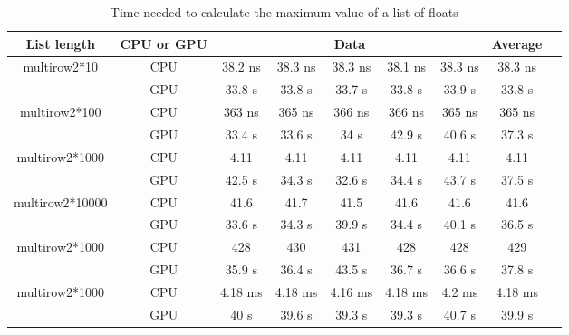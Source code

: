 \begin{table}[H]
  \caption{Time needed to calculate the maximum value of a list of floats}
  \label{table:time}
  \begin{center}
	  \begin{tabular}{| c | c | c | c | c | c | c | c | c |}
	    \hline
	    List length & CPU or GPU & \multicolumn{5}{|c|}{Data} & Average\\
		  \hline
		  multirow{2}{*}{10} & CPU & 38.2 ns & 38.3 ns & 38.3 ns & 38.1 ns & 38.3 ns & 38.3 ns\\ 
		  \hline
		  & GPU & 33.8 \mu s & 33.8 \mu s & 33.7 \mu s & 33.8 \mu s & 33.9 \mu s & 33.8 \mu s\\ 
		  \hline
		  multirow{2}{*}{100} & CPU & 363 ns & 365 ns & 366 ns & 366 ns & 365 ns & 365 ns\\ 
		  \hline
		  & GPU & 33.4 \mu s & 33.6 \mu s & 34 \mu s & 42.9 \mu s & 40.6 \mu s & 37.3 \mu s\\ 
		  \hline
		  multirow{2}{*}{1000} & CPU & 4.11 \mu & 4.11 \mu & 4.11 \mu & 4.11 \mu & 4.11 \mu & 4.11 \mu \\ 
		  \hline
		  & GPU & 42.5 \mu s & 34.3 \mu s & 32.6 \mu s & 34.4 \mu s & 43.7 \mu s & 37.5 \mu s\\  
		  \hline
		  multirow{2}{*}{10000} & CPU & 41.6 \mu & 41.7 \mu & 41.5 \mu & 41.6 \mu & 41.6 \mu & 41.6 \mu \\ 
		  \hline
		  & GPU & 33.6 \mu s & 34.3 \mu s & 39.9 \mu s & 34.4 \mu s & 40.1 \mu s & 36.5 \mu s\\  
		  \hline
		  multirow{2}{*}{1000} & CPU & 428 \mu & 430 \mu & 431 \mu & 428 \mu & 428 \mu & 429 \mu \\ 
		  \hline
		  & GPU & 35.9 \mu s & 36.4 \mu s & 43.5 \mu s & 36.7 \mu s & 36.6 \mu s & 37.8 \mu s\\  
		  \hline
		  multirow{2}{*}{1000} & CPU & 4.18 ms & 4.18 ms & 4.16 ms & 4.18 ms & 4.2 ms & 4.18 ms\\ 
		  \hline
		  & GPU & 40 \mu s & 39.6 \mu s & 39.3 \mu s & 39.3 \mu s & 40.7 \mu s & 39.9 \mu s\\ 
		  \hline
	  \end{tabular}
  \end{center}
\end{table}
